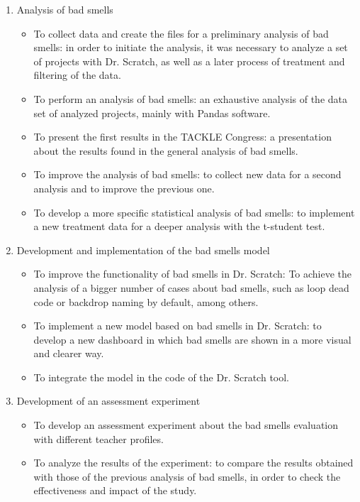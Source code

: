 \begin{enumerate}
\begin{itemize}
    \end{itemize}
    \item Analysis of bad smells
    \begin{itemize}
        \item To collect data and create the files for a preliminary analysis of bad smells: in order to initiate the analysis, it was necessary to analyze a set of projects with Dr. Scratch, as well as a later process of treatment and filtering of the data.
        \item To perform an analysis of bad smells: an exhaustive analysis of the data set of analyzed projects, mainly with Pandas software. 
        \item To present the first results in the TACKLE Congress: a presentation about the results found in the general analysis of bad smells.
        \item To improve the analysis of bad smells: to collect new data for a second analysis and to improve the previous one.
        \item To develop a more specific statistical analysis of bad smells: to implement a new treatment data for a deeper analysis with the t-student test. 
    \end{itemize}
    \item Development and implementation of the bad smells model
    \begin{itemize}
        \item To improve the functionality of bad smells in Dr. Scratch: To achieve the analysis of a bigger number of cases about bad smells, such as loop dead code or backdrop naming by default, among others.
        \item To implement a new model based on bad smells in Dr. Scratch: to develop a new dashboard in which bad smells are shown in a more visual and clearer way.
        \item To integrate the model in the code of the Dr. Scratch tool.
    \end{itemize}
    \item Development of an assessment experiment
    \begin{itemize}
        \item To develop an assessment experiment about the bad smells evaluation with different teacher profiles.
        \item To analyze the results of the experiment: to compare the results obtained with those of the previous analysis of bad smells, in order to check the effectiveness and impact of the study.
    \end{itemize}
\end{enumerate}



